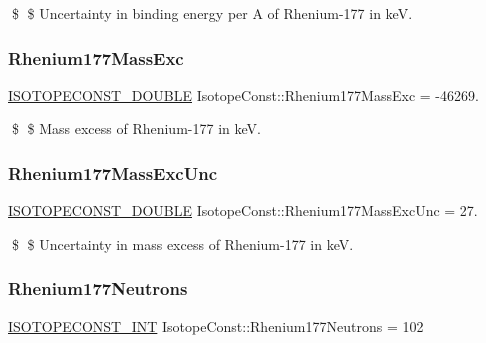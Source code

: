 \$ \$ Uncertainty in binding energy per A of Rhenium-\/177 in keV. \mbox{\label{group___isotope_const-_rhenium-_re177_gabb4aba9c585fae5c81b0e623e39be9aa}} 
\subsubsection{\texorpdfstring{Rhenium177\+Mass\+Exc}{Rhenium177MassExc}}
{\footnotesize\ttfamily \mbox{\hyperlink{group___isotope_const-_macros_ga8f45a7272ce02c0b4c65c44636ed719a}{I\+S\+O\+T\+O\+P\+E\+C\+O\+N\+S\+T\+\_\+\+D\+O\+U\+B\+LE}} Isotope\+Const\+::\+Rhenium177\+Mass\+Exc = -\/46269.}

\$ \$ Mass excess of Rhenium-\/177 in keV. \mbox{\label{group___isotope_const-_rhenium-_re177_gad2cd7d27b9075ea3774dae5c0b0429a8}} 
\subsubsection{\texorpdfstring{Rhenium177\+Mass\+Exc\+Unc}{Rhenium177MassExcUnc}}
{\footnotesize\ttfamily \mbox{\hyperlink{group___isotope_const-_macros_ga8f45a7272ce02c0b4c65c44636ed719a}{I\+S\+O\+T\+O\+P\+E\+C\+O\+N\+S\+T\+\_\+\+D\+O\+U\+B\+LE}} Isotope\+Const\+::\+Rhenium177\+Mass\+Exc\+Unc = 27.}

\$ \$ Uncertainty in mass excess of Rhenium-\/177 in keV. \mbox{\label{group___isotope_const-_rhenium-_re177_gae40c82a92eec45ef91702508d8479a43}} 
\subsubsection{\texorpdfstring{Rhenium177\+Neutrons}{Rhenium177Neutrons}}
{\footnotesize\ttfamily \mbox{\hyperlink{group___isotope_const-_macros_ga5f18360b3e99483a35c32d789e62621c}{I\+S\+O\+T\+O\+P\+E\+C\+O\+N\+S\+T\+\_\+\+I\+NT}} Isotope\+Const\+::\+Rhenium177\+Neutrons = 102}

